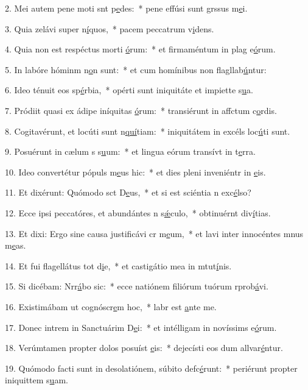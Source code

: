 2. Mei autem pene moti snt p\uline{e}des:~* pene effúsi sunt grssus m\uline{e}i.\par 
3. Quia zelávi super n\uline{í}quos,~* pacem peccatrum v\uline{i}dens.\par 
4. Quia non est respéctus morti \uline{ó}rum:~* et firmaméntum in plag e\uline{ó}rum.\par 
5. In labóre hóminm n\uline{o}n sunt:~* et cum homínibus non flagllab\uline{ú}ntur:\par 
6. Ideo ténuit eos sp\uline{é}rbia,~* opérti sunt iniquitáte et impiette s\uline{u}a.\par 
7. Pródiit quasi ex ádipe iníquitas \uline{ó}rum:~* transiérunt in affctum c\uline{o}rdis.\par 
8. Cogitavérunt, et locúti sunt n\uline{quí}tiam:~* iniquitátem in excéls loc\uline{ú}ti sunt.\par 
9. Posuérunt in cælum s s\uline{u}um:~* et lingua eórum transívt in t\uline{e}rra.\par 
10. Ideo convertétur pópuls m\uline{e}us hic:~* et dies pleni inveniéntr in \uline{e}is.\par 
11. Et dixérunt: Quómodo sct D\uline{e}us,~* et si est sciéntia n exc\uline{é}lso?\par 
12. Ecce ipsi peccatóres, et abundántes n s\uline{ǽ}culo,~* obtinuérnt div\uline{í}tias.\par 
13. Et dixi: Ergo sine causa justificávi cr m\uline{e}um,~* et lavi inter innocéntes mnus m\uline{e}as.\par 
14. Et fui flagellátus tot d\uline{i}e,~* et castigátio mea in mtut\uline{í}nis.\par 
15. Si dicébam: Nrr\uline{á}bo sic:~* ecce natiónem filiórum tuórum rprob\uline{á}vi.\par 
16. Existimábam ut cognóscr\uline{e}m hoc,~* labr est \uline{a}nte me.\par 
17. Donec intrem in Sanctuárim D\uline{e}i:~* et intélligam in novíssims e\uline{ó}rum.\par 
18. Verúmtamen propter dolos posuíst \uline{e}is:~* dejecísti eos dum allvar\uline{é}ntur.\par 
19. Quómodo facti sunt in desolatiónem, súbito defc\uline{é}runt:~* periérunt propter iniquittem s\uline{u}am.\par 
